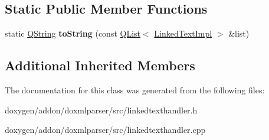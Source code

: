 \subsection*{Static Public Member Functions}
\begin{DoxyCompactItemize}
\item 
\mbox{\label{class_linked_text_handler_aafce861fdb6ee2aa4efb5415b33733e5}} 
static \mbox{\hyperlink{class_q_string}{Q\+String}} {\bfseries to\+String} (const \mbox{\hyperlink{class_q_list}{Q\+List}}$<$ \mbox{\hyperlink{class_linked_text_impl}{Linked\+Text\+Impl}} $>$ \&list)
\end{DoxyCompactItemize}
\subsection*{Additional Inherited Members}


The documentation for this class was generated from the following files\+:\begin{DoxyCompactItemize}
\item 
doxygen/addon/doxmlparser/src/linkedtexthandler.\+h\item 
doxygen/addon/doxmlparser/src/linkedtexthandler.\+cpp\end{DoxyCompactItemize}
